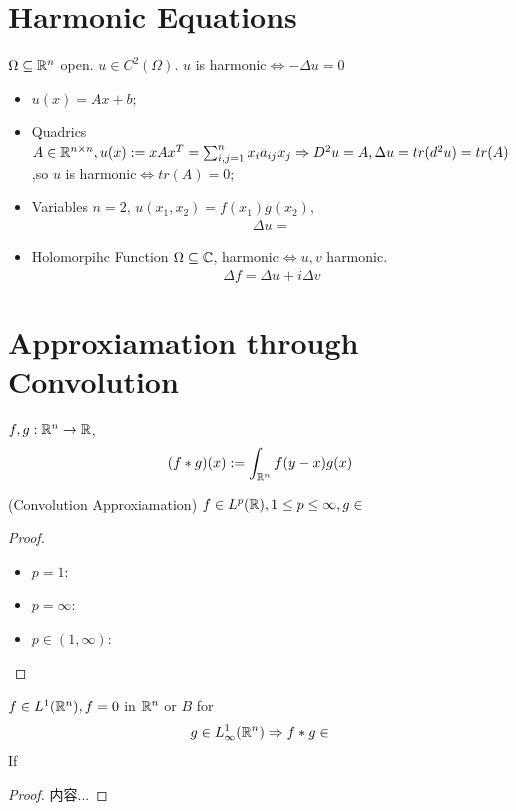 \documentclass[Total.tex]{subfiles}
\begin{document}
		\section{Harmonic Equations}
			\begin{Def}
				$\Omega\subseteq \mathbb{R}^n$ open. $u\in C^2(\Omega)$. $u$ is harmonic$\Leftrightarrow -\Delta u=0$ 
			\end{Def}
			\begin{example}
				\begin{itemize}
					\item $u(x)=Ax+b$;
					\item Quadrics $A\in \mathbb{R}^{n\times n},u(x):=xAx^T=\sum_{i,j=1}^n x_i a_{ij}x_j\Rightarrow D^2u=A,\Delta u=tr(d^2 u)=tr(A)$,so $u$ is harmonic$\Leftrightarrow tr(A)=0$;
					\item Variables $n=2$, $u(x_1,x_2)=f(x_1)g(x_2)$,
					\begin{gather*}
						\Delta u=
					\end{gather*}
					\item Holomorpihc Function $\Omega\subseteq \mathbb{C}$, harmonic$\Leftrightarrow u,v$ harmonic.
					\begin{gather*}
						\Delta f=\Delta u+i\Delta v
					\end{gather*}
				\end{itemize}
			\end{example}
		\section{Approxiamation through Convolution}
			\begin{Def}
				$f,g:\mathbb{R}^n\rightarrow \mathbb{R}$,
				\begin{gather*}
					(f*g)(x):=\int_{\mathbb{R}^n} f(y-x)g(x)
				\end{gather*}
			\end{Def}
			\begin{lemma}
				(Convolution Approxiamation) $f\in L^p(\mathbb{R}),1\leq p\leq \infty,g\in $
			\end{lemma}
			\begin{proof}
				\begin{itemize}
					\item $p=1$:
					\item $p=\infty$:
					\item $p\in (1,\infty)$:
				\end{itemize}
			\end{proof}
			
			\begin{lemma}
				$f\in L^1(\mathbb{R}^n),f=0$ in $\mathbb{R}^n$ or $B$ for 
				\begin{gather*}
					g\in L^1_\infty(\mathbb{R}^n)\Rightarrow f*g\in 
				\end{gather*}
				If 
			\end{lemma}
			\begin{proof}
				内容...
			\end{proof}
			
\end{document}

